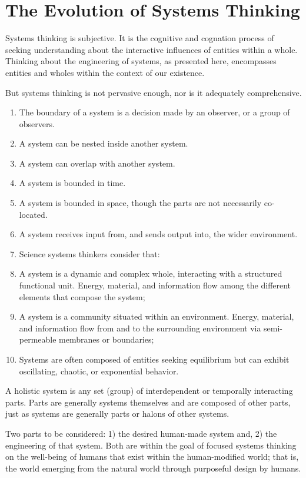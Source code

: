 \section{The Evolution of Systems Thinking}

Systems thinking is subjective. It is the cognitive and cognation process of seeking understanding about the interactive influences of entities within a whole. Thinking about the engineering of systems, as presented here, encompasses entities and wholes within the context of our existence.

But systems thinking is not pervasive enough, nor is it adequately comprehensive. 

\begin{enumerate}
\item The boundary of a system is a decision made by an observer, or a group of observers.
\item A system can be nested inside another system.
\item A system can overlap with another system.
\item A system is bounded in time.
\item A system is bounded in space, though the parts are not necessarily co-located.
\item A system receives input from, and sends output into, the wider environment.
\item Science systems thinkers consider that:
\item A system is a dynamic and complex whole, interacting with a structured functional unit. Energy, material, and information flow among the different elements that compose the system;
\item A system is a community situated within an environment. Energy, material, and information flow from and to the surrounding environment via semi-permeable membranes or boundaries;
\item Systems are often composed of entities seeking equilibrium but can exhibit oscillating, chaotic, or exponential behavior.
\end{enumerate}

A holistic system is any set (group) of interdependent or temporally interacting parts. Parts are generally systems themselves and are composed of other parts, just as systems are generally parts or halons of other systems.

Two parts to be considered: 1) the desired human-made system and, 2) the engineering of that system. Both are within the goal of focused systems thinking on the well-being of humans that exist within the human-modified world; that is, the world emerging from the natural world through purposeful design by humans.

